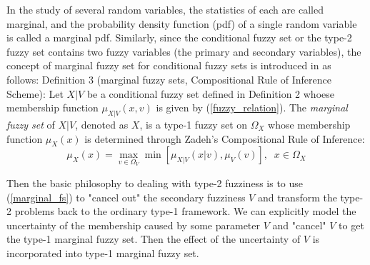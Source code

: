 \documentclass[journal]{IEEEtran}
\begin{document}
In the study of several random variables, the statistics of each are called marginal, and the probability density function (pdf) of a single random variable is called a marginal pdf. Similarly, since the conditional fuzzy set or the type-2 fuzzy set contains two fuzzy variables (the primary and secondary variables), the concept of marginal fuzzy set for conditional fuzzy sets is introduced in \cite{wang_new_2016} as follows:
Definition 3 (marginal fuzzy sets, Compositional Rule of Inference Scheme): Let $X|V$ be a conditional fuzzy set defined in Definition 2 whoese membership function $\mu_{X|V}(x,v)$ is given by (\ref{fuzzy_relation}). The \emph{marginal fuzzy set} of $X|V$, denoted as $X$, is a type-1 fuzzy set on $\Omega_X$ whose membership function $\mu_X(x)$ is determined through Zadeh's Compositional Rule of Inference:
\label{marginal_fs}
\begin{equation}
\mu_X(x)=\max_{v\in\Omega_V}\min[\mu_{X|V}(x|v),\mu_V(v)],\;\;x\in\Omega_X
\end{equation}

Then the basic philosophy to dealing with type-2 fuzziness is to use (\ref{marginal_fs}) to "cancel out" the secondary fuzziness $V$ and transform the type-2 problems back to the ordinary type-1 framework. We can explicitly model the uncertainty of the membership caused by some parameter $V$ and "cancel" $V$ to get the type-1 marginal fuzzy set. Then the effect of the uncertainty of $V$ is incorporated into type-1 marginal fuzzy set. 
\end{document}
